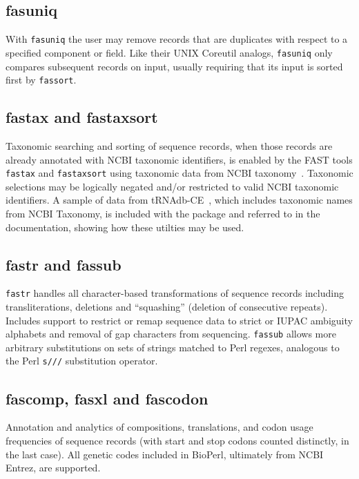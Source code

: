 \documentclass{frontiersSCNS} %
\begin{document}
\subsection{fasuniq}

With {\tt fasuniq} the user may remove records that are duplicates
with respect to a specified component or field. Like their UNIX
Coreutil analogs, {\tt fasuniq} only compares subsequent records on
input, usually requiring that its input is sorted first by {\tt fassort}.

\subsection{fastax and fastaxsort}

Taxonomic searching and sorting of sequence records, when those
records are already annotated with NCBI taxonomic identifiers, is
enabled by the FAST tools {\tt fastax} and {\tt fastaxsort} using
taxonomic data from NCBI taxonomy~\citep{Benson2009,
  Sayers2009}. Taxonomic selections may be logically negated and/or
restricted to valid NCBI taxonomic identifiers. A sample
of data from tRNAdb-CE~\citep{10.3389/fgene.2014.00114}, which
includes taxonomic names from NCBI Taxonomy, is included with the
package and referred to in the documentation, showing how these
utilties may be used.

\subsection{fastr and fassub} 

{\tt fastr} handles all character-based transformations of sequence
records including transliterations, deletions and ``squashing''
(deletion of consecutive repeats). Includes support to restrict or remap 
sequence data to strict or IUPAC ambiguity alphabets and removal of
gap characters from sequencing. {\tt fassub} allows more arbitrary
substitutions on sets of strings matched to Perl regexes, analogous to
the Perl {\tt s///} substitution operator.

\subsection{fascomp, fasxl and fascodon}

Annotation and analytics of compositions, translations, and codon
usage frequencies of sequence records (with start and stop codons
counted distinctly, in the last case). All genetic codes included in
BioPerl, ultimately from NCBI Entrez, are supported.
\end{document}
